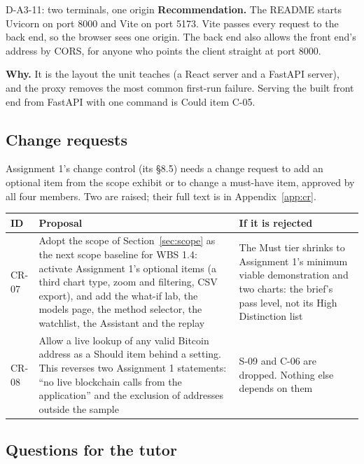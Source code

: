 \begin{decision}{D-A3-11: two terminals, one origin}
\textbf{Recommendation.} The README starts Uvicorn on port 8000 and Vite on port 5173. Vite passes
every  request to the back end, so the browser sees one origin. The back end also allows
the front end's address by CORS, for anyone who points the client straight at port 8000.

\textbf{Why.} It is the layout the unit teaches (a React server and a FastAPI server), and the
proxy removes the most common first-run failure. Serving the built front end from FastAPI with one
command is Could item C-05.
\end{decision}

\subsection{Change requests}

Assignment 1's change control (its §8.5) needs a change request to add an optional item from the
scope exhibit or to change a must-have item, approved by all four members. Two are raised; their
full text is in Appendix~\ref{app:cr}.

\begin{center}
\small
\begin{tabularx}{\textwidth}{@{}L{1.4cm}Y L{3.6cm}@{}}
\toprule
\textbf{ID} & \textbf{Proposal} & \textbf{If it is rejected} \\
\midrule
CR-07 & Adopt the scope of Section~\ref{sec:scope} as the next scope baseline for WBS 1.4: activate Assignment 1's optional items (a third chart type, zoom and filtering, CSV export), and add the what-if lab, the models page, the method selector, the watchlist, the Assistant and the replay & The Must tier shrinks to Assignment 1's minimum viable demonstration and two charts: the brief's pass level, not its High Distinction list \\
CR-08 & Allow a live lookup of any valid Bitcoin address as a Should item behind a setting. This reverses two Assignment 1 statements: ``no live blockchain calls from the application'' and the exclusion of addresses outside the sample & S-09 and C-06 are dropped. Nothing else depends on them \\
\bottomrule
\end{tabularx}
\end{center}

\subsection{Questions for the tutor}
\label{sec:tutorq}

